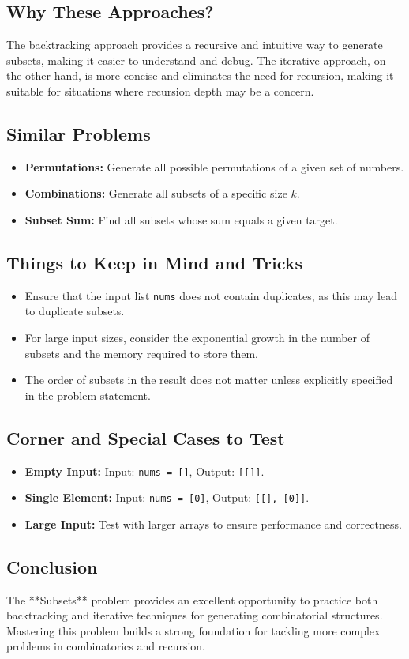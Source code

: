 \subsection*{Why These Approaches?}
The backtracking approach provides a recursive and intuitive way to generate subsets, making it easier to understand and debug. The iterative approach, on the other hand, is more concise and eliminates the need for recursion, making it suitable for situations where recursion depth may be a concern.

\subsection*{Similar Problems}
\begin{itemize}
    \item \textbf{Permutations:} Generate all possible permutations of a given set of numbers.
    \item \textbf{Combinations:} Generate all subsets of a specific size \(k\).
    \item \textbf{Subset Sum:} Find all subsets whose sum equals a given target.
\end{itemize}

\subsection*{Things to Keep in Mind and Tricks}
\begin{itemize}
    \item Ensure that the input list \texttt{nums} does not contain duplicates, as this may lead to duplicate subsets.
    \item For large input sizes, consider the exponential growth in the number of subsets and the memory required to store them.
    \item The order of subsets in the result does not matter unless explicitly specified in the problem statement.
\end{itemize}

\subsection*{Corner and Special Cases to Test}
\begin{itemize}
    \item \textbf{Empty Input:} Input: \texttt{nums = []}, Output: \texttt{[[]]}.
    \item \textbf{Single Element:} Input: \texttt{nums = [0]}, Output: \texttt{[[], [0]]}.
    \item \textbf{Large Input:} Test with larger arrays to ensure performance and correctness.
\end{itemize}

\subsection*{Conclusion}
The **Subsets** problem provides an excellent opportunity to practice both backtracking and iterative techniques for generating combinatorial structures. Mastering this problem builds a strong foundation for tackling more complex problems in combinatorics and recursion.